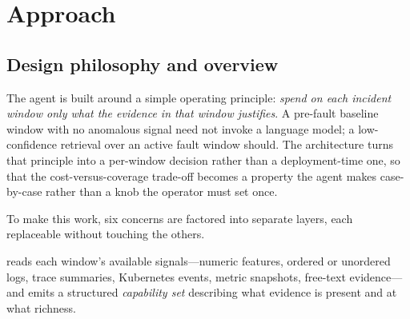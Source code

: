 %
%

\section{Approach}
\label{sec:approach}

\subsection{Design philosophy and overview}
\label{sec:approach:overview}

The agent is built around a simple operating principle: \emph{spend on each incident window only what the evidence in that window justifies}. A pre-fault baseline window with no anomalous signal need not invoke a language model; a low-confidence retrieval over an active fault window should. The architecture turns that principle into a per-window decision rather than a deployment-time one, so that the cost-versus-coverage trade-off becomes a property the agent makes case-by-case rather than a knob the operator must set once.

To make this work, six concerns are factored into separate layers, each replaceable without touching the others.

 reads each window's available signals---numeric features, ordered or unordered logs, trace summaries, Kubernetes events, metric snapshots, free-text evidence---and emits a structured \emph{capability set} describing what evidence is present and at what richness.

